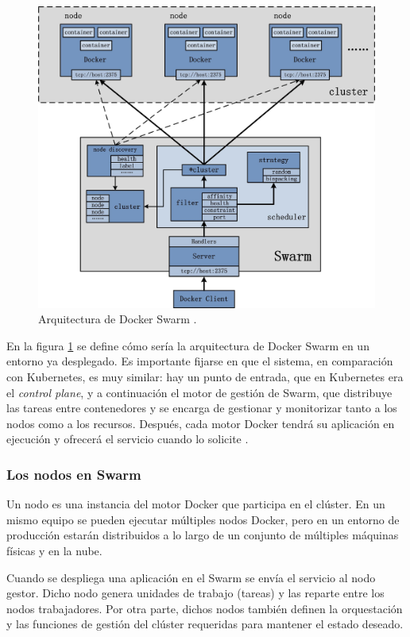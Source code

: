 \begin{figure}[H]
    \centering
    \includegraphics[width=\linewidth]{pictures/swarm-arch.jpeg}
    \caption{Arquitectura de Docker Swarm \autocite{IndepthExplanationSwarm}.}
    \label{fig:swarm-arch}
\end{figure}

En la figura \ref{fig:swarm-arch} se define cómo sería la arquitectura de Docker
Swarm en un entorno ya desplegado. Es importante fijarse en que el sistema, en
comparación con Kubernetes, es muy similar: hay un punto de entrada, que en
Kubernetes era el \textit{control plane}, y a continuación el motor de gestión 
de Swarm, que distribuye las tareas entre contenedores y se encarga de gestionar
y monitorizar tanto a los nodos como a los recursos. Después, cada motor Docker
tendrá su aplicación en ejecución y ofrecerá el servicio cuando lo solicite
\autocite{SwarmModeKey2021}.

\subsubsection*{Los nodos en Swarm}
Un nodo es una instancia del motor Docker que participa en el clúster. En un mismo
equipo se pueden ejecutar múltiples nodos Docker, pero en un entorno de producción
estarán distribuidos a lo largo de un conjunto de múltiples máquinas físicas
y en la nube.

Cuando se despliega una aplicación en el Swarm se envía el servicio al nodo gestor.
Dicho nodo genera unidades de trabajo (tareas) y las reparte entre los nodos
trabajadores. Por otra parte, dichos nodos también definen la orquestación y las
funciones de gestión del clúster requeridas para mantener el estado deseado.

